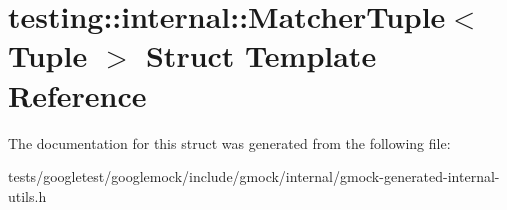 \hypertarget{structtesting_1_1internal_1_1MatcherTuple}{}\section{testing\+:\+:internal\+:\+:Matcher\+Tuple$<$ Tuple $>$ Struct Template Reference}
\label{structtesting_1_1internal_1_1MatcherTuple}


The documentation for this struct was generated from the following file\+:\begin{DoxyCompactItemize}
\item 
tests/googletest/googlemock/include/gmock/internal/gmock-\/generated-\/internal-\/utils.\+h\end{DoxyCompactItemize}
